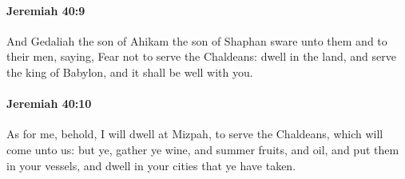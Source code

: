 		\paragraph{Jeremiah 40:9} %
			\label{JEREMIAH-40-9}

			And Gedaliah the son of Ahikam the son of Shaphan sware unto them and to their men, saying, Fear not to serve the Chaldeans: dwell in the land, and serve the king of Babylon, and it shall be well with you.


		\paragraph{Jeremiah 40:10} %
			\label{JEREMIAH-40-10}

			As for me, behold, I will dwell at Mizpah, to serve the Chaldeans, which will come unto us: but ye, gather ye wine, and summer fruits, and oil, and put them in your vessels, and dwell in your cities that ye have taken.

